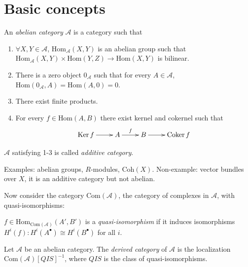 \section{Basic concepts}
\label{section-basic-concepts}

\begin{definition}
\label{definition-abelian-category}
An {\it abelian category} $\mathcal{A}$ is a
category such that
\begin{enumerate}
\item $\forall X,Y \in \mathcal{A}$,
$\text{Hom}_{\mathcal{A}}(X,Y)$ is an
abelian group such that
$\text{Hom}_{\mathcal{A}}(X,Y)
\times\text{Hom}
(Y,Z)\to
\text{Hom}(X,Y)$ is bilinear.
\item There is a zero object
$0_{\mathcal{A}}$ such that for every $A \in
\mathcal{A}$,
$\text{Hom}(0_{\mathcal{A}},A)=\text{Hom}(A,
0)
=0$.
\item There exist finite products.
\item For every  $f \in \text{Hom}(A,B)$
there exist kernel and cokernel such
that
$$
\xymatrix{
\Ker f\ar[r]&A\ar[r]^{f}&B\ar[r]&\Coker f
}
$$
\end{enumerate}
\end{definition}

\begin{definition}
\label{definition-additive-category}
$\mathcal{A}$ satisfying 1-3 is called  {\it
additive category}.
\end{definition}

Examples: abelian groups, $R$-modules,
$\text{Coh}(X)$. Non-example: vector bundles
over $X$, it is an additive category but not
abelian.

\medskip\noindent

Now consider the category
$\text{Com}(\mathcal{A})$, the category of
complexes in $\mathcal{A}$, with
quasi-isomorphisms:

\begin{definition}
\label{definition-quasi-isomorphism}
$f\in
\text{Hom}_{\text{Com}(\mathcal{A})}(A',B')$
is a {\it quasi-isomorphism} if it induces
isomorphisms $H^i(f):H^i(A^{\bullet})\cong
H^i(B^{\bullet})$ for all $i$.
\end{definition}

\begin{definition}
\label{definition-derived-category}
Let $\mathcal{A}$ be an abelian category. The
{\it derived category} of $\mathcal{A}$ is
the localization
$\text{Com}(\mathcal{A})[QIS]^{-1}$, where
$QIS$ is the class of quasi-isomorphisms.
\end{definition}


